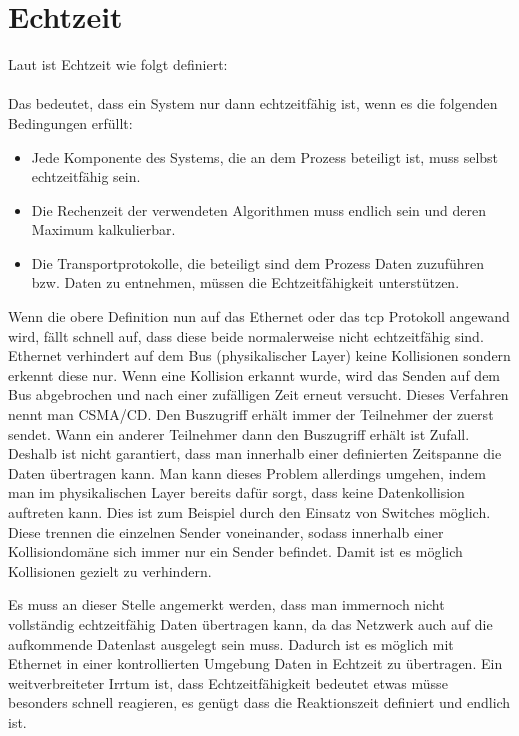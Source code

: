 \section{Echtzeit}
Laut \citet{Scholz:2005} ist Echtzeit wie folgt definiert:\\
\\
Das bedeutet, dass ein System nur dann echtzeitfähig ist, wenn es die folgenden Bedingungen erfüllt:
\begin{itemize}
  \item Jede Komponente des Systems, die an dem Prozess beteiligt ist, muss selbst echtzeitfähig sein.
  \item Die Rechenzeit der verwendeten Algorithmen muss endlich sein und deren Maximum kalkulierbar.
  \item Die Transportprotokolle, die beteiligt sind dem Prozess Daten zuzuführen bzw. Daten zu entnehmen, müssen die Echtzeitfähigkeit unterstützen.
\end{itemize}
Wenn die obere Definition nun auf das Ethernet oder das \ac{tcp} Protokoll angewand wird, fällt schnell auf, 
dass diese beide normalerweise nicht echtzeitfähig sind.
Ethernet verhindert auf dem Bus (physikalischer Layer) keine Kollisionen sondern erkennt diese nur. 
Wenn eine Kollision erkannt wurde, 
wird das Senden auf dem Bus abgebrochen und nach einer zufälligen Zeit erneut versucht.
Dieses Verfahren nennt man \ac{CSMA/CD}. 
Den Buszugriff erhält immer der Teilnehmer der zuerst sendet. Wann ein anderer Teilnehmer dann den Buszugriff erhält ist Zufall.
Deshalb ist nicht garantiert, dass man innerhalb einer definierten Zeitspanne die Daten übertragen kann.
Man kann dieses Problem allerdings umgehen, indem man im physikalischen Layer bereits dafür sorgt, 
dass keine Datenkollision auftreten kann. Dies ist zum Beispiel durch den Einsatz von Switches möglich.
Diese trennen die einzelnen Sender voneinander, sodass innerhalb einer Kollisiondomäne sich immer nur ein Sender befindet. Damit ist es möglich Kollisionen gezielt zu verhindern.

Es muss an dieser Stelle angemerkt werden, dass man immernoch nicht vollständig echtzeitfähig Daten übertragen kann, 
da das Netzwerk auch auf die aufkommende Datenlast ausgelegt sein muss.
Dadurch ist es möglich mit Ethernet in einer kontrollierten Umgebung Daten in Echtzeit zu übertragen.
Ein weitverbreiteter Irrtum ist, dass Echtzeitfähigkeit bedeutet etwas müsse besonders schnell reagieren, 
es genügt dass die Reaktionszeit definiert und endlich ist.